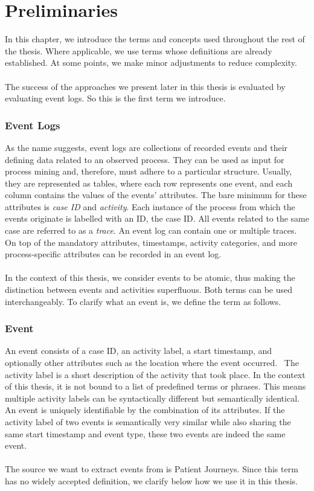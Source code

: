 
\section{Preliminaries}\label{sec:back}
In this chapter, we introduce the terms and concepts used throughout the rest of the thesis. Where applicable, we use terms whose definitions are already established. At some points, we make minor adjustments to reduce complexity.\\\\ 
The success of the approaches we present later in this thesis is evaluated by evaluating event logs. So this is the first term we introduce.
\subsubsection*{Event Logs}\label{sec:event-log}
As the name suggests, event logs are collections of recorded events and their defining data related to an observed process. They can be used as input for process mining and, therefore, must adhere to a particular structure. Usually, they are represented as tables, where each row represents one event, and each column contains the values of the events' attributes. The bare minimum for these attributes is \emph{case ID} and \emph{activity}. Each instance of the process from which the events originate is labelled with an ID, the case ID. All events related to the same case are referred to as a \emph{trace}. An event log can contain one or multiple traces. On top of the mandatory attributes, timestamps, activity categories, and more process-specific attributes can be recorded in an event log.~\cite{van_der_aalst_process_2016}\\\\
In the context of this thesis, we consider events to be atomic, thus making the distinction between events and activities superfluous. Both terms can be used interchangeably. To clarify what an event is, we define the term as follows.

\subsubsection*{Event}\label{sec:event}
An event consists of a case ID, an activity label, a start timestamp, and optionally other attributes such as the location where the event occurred.~\cite{van_der_aalst_process_2016} The activity label is a short description of the activity that took place. In the context of this thesis, it is not bound to a list of predefined terms or phrases. This means multiple activity labels can be syntactically different but semantically identical. An event is uniquely identifiable by the combination of its attributes. If the activity label of two events is semantically very similar while also sharing the same start timestamp and event type, these two events are indeed the same event.\\\\
The source we want to extract events from is Patient Journeys. Since this term has no widely accepted definition, we clarify below how we use it in this thesis.

